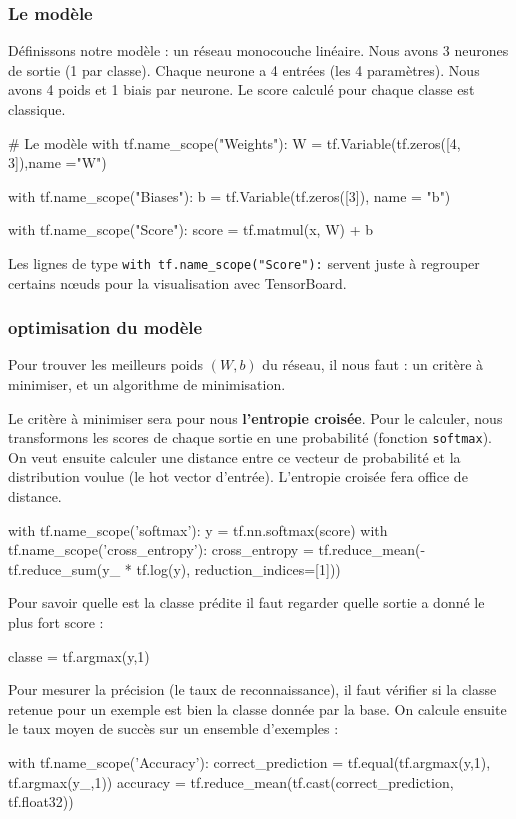 \documentclass[a4paper,11pt]{book}
\begin{document}
\subsubsection{Le modèle}
Définissons notre modèle : un réseau monocouche linéaire.
Nous avons 3 neurones de sortie (1 par classe).
Chaque neurone a 4 entrées (les 4 paramètres).
Nous avons 4 poids et 1 biais par neurone.
Le score calculé pour chaque classe est classique.
\begin{mypython}
# Le modèle
with tf.name_scope("Weights"):
	W = tf.Variable(tf.zeros([4, 3]),name ="W")

with tf.name_scope("Biases"):
	b = tf.Variable(tf.zeros([3]), name = "b")
	
with tf.name_scope("Score"):
	score = tf.matmul(x, W) + b
\end{mypython}
Les lignes de type \verb+with tf.name_scope("Score"):+ servent juste à regrouper certains nœuds pour la visualisation avec TensorBoard.

\subsubsection{optimisation du modèle}
Pour trouver les meilleurs poids $(W,b)$ du réseau, il nous faut : un critère à minimiser, et un algorithme de minimisation.


Le critère à minimiser sera pour nous \textbf{l'entropie croisée}.
Pour le calculer, nous transformons les scores de chaque sortie en une probabilité (fonction \verb+softmax+). On veut ensuite calculer une distance entre ce vecteur de probabilité et la distribution voulue (le hot vector d'entrée). L'entropie croisée fera office de distance.
\begin{mypython}
with tf.name_scope('softmax'):
	y = tf.nn.softmax(score)
with tf.name_scope('cross_entropy'):
	cross_entropy = tf.reduce_mean(-tf.reduce_sum(y_ * tf.log(y), reduction_indices=[1]))
\end{mypython}

Pour savoir quelle est la classe prédite il faut regarder quelle sortie a donné le plus fort score :
\begin{mypython}
classe = tf.argmax(y,1)    
\end{mypython}

Pour mesurer la précision (le taux de reconnaissance), il faut vérifier si la classe retenue pour un exemple est bien la classe donnée par la base. On calcule ensuite le taux moyen de succès sur un ensemble d'exemples :
\begin{mypython}
with tf.name_scope('Accuracy'):
	correct_prediction = tf.equal(tf.argmax(y,1), tf.argmax(y_,1))
	accuracy = tf.reduce_mean(tf.cast(correct_prediction, tf.float32))
\end{mypython}
\end{document}
